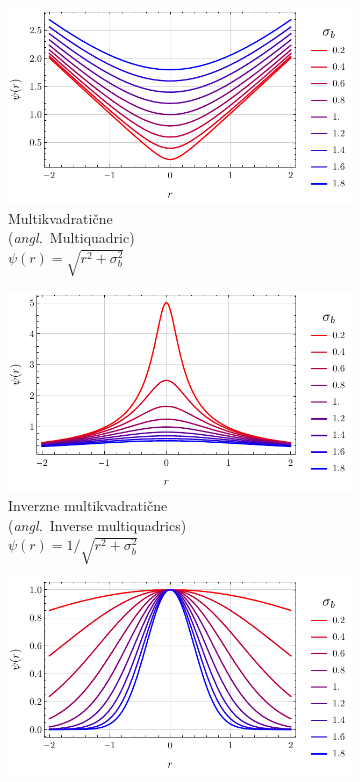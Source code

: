 \documentclass[12pt,a4paper,twoside]{article}
\theoremstyle{definition} %
\theoremstyle{plain} %
\numberwithin{equation}{section}
\newcommand{\ang}[1]{(\textit{angl.}\ #1)}
\begin{document}
\begin{figure}[h]
  \centering
  \begin{subfigure}[t]{0.33\textwidth}
    \includegraphics[width=\textwidth]{images/rbf_mq.pdf}
    \caption[Multikvadratične]{Multikvadratične \\ \ang{Multiquadric}  \\ $\psi(r) = \sqrt{r^2+\sigma_b^2}$}
  \end{subfigure}
  \begin{subfigure}[t]{0.33\textwidth}
    \includegraphics[width=\textwidth]{images/rbf_imq.pdf}
    \caption[Inverzne multikvadratične]{Inverzne multikvadratične \\ \ang{Inverse multiquadrics}  \\ $\psi(r) = 1 / \sqrt{r^2+\sigma_b^2}$}
  \end{subfigure}
  \begin{subfigure}[t]{0.32\textwidth}
    \includegraphics[width=\textwidth]{images/rbf_gau.pdf}

\end{subfigure}
\end{figure}
\end{document}
